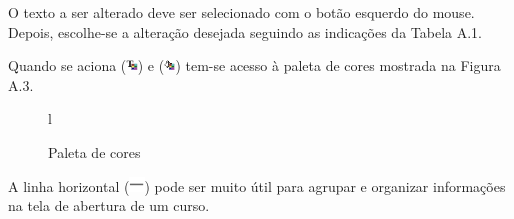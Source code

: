 O texto a ser alterado deve ser selecionado com o botão esquerdo do mouse. Depois, escolhe-se a alteração desejada seguindo as indicações da Tabela A.1.

Quando se aciona (\includegraphics[width=0.3cm]{imagem/cap0/ed_color_fg.jpg}) e 
(\includegraphics[width=0.3cm]{imagem/cap0/ed_color_bg.jpg}) tem-se acesso à paleta de cores mostrada na Figura A.3.

\begin{figure}{l}
 \begin{center}
  \caption{Paleta de cores}
 \end{center}
\end{figure}

A linha horizontal (\includegraphics[width=0.4cm]{imagem/cap0/hr.jpg}) pode ser muito útil para agrupar e organizar informações na tela de abertura de um curso.

